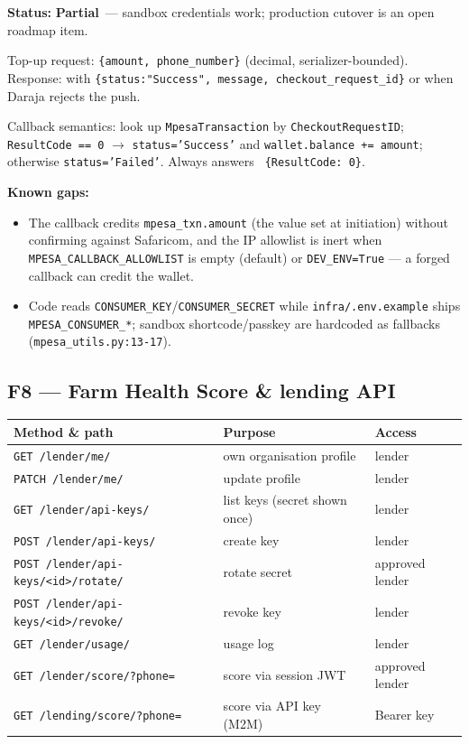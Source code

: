 \documentclass[11pt,a4paper]{article}
\newcommand{\partialstatus}{\textcolor{statuspart}{\textbf{Partial}}}
\newcommand{\code}[1]{\texttt{\allowbreak #1\allowbreak}}
\begin{document}
\textbf{Status:} \partialstatus\ --- sandbox credentials work; production
cutover is an open roadmap item.

Top-up request: \code{\{amount, phone\_number\}} (decimal, serializer-bounded).
Response: \code{200} with
\code{\{status:"Success", message, checkout\_request\_id\}} or \code{502}
when Daraja rejects the push.

Callback semantics: look up \code{MpesaTransaction} by
\code{CheckoutRequestID}; \code{ResultCode == 0} $\rightarrow$
\code{status='Success'} and \code{wallet.balance += amount}; otherwise
\code{status='Failed'}. Always answers \code{200 \{ResultCode: 0\}}.

\textbf{Known gaps:}
\begin{itemize}
  \item The callback credits \code{mpesa\_txn.amount} (the value set at
        initiation) without confirming against Safaricom, and the IP
        allowlist is inert when \code{MPESA\_CALLBACK\_ALLOWLIST} is empty
        (default) or \code{DEV\_ENV=True} --- a forged callback can credit
        the wallet.
  \item Code reads \code{CONSUMER\_KEY}/\code{CONSUMER\_SECRET} while
        \code{infra/.env.example} ships \code{MPESA\_CONSUMER\_*}; sandbox
        shortcode/passkey are hardcoded as fallbacks
        (\code{mpesa\_utils.py:13-17}).
\end{itemize}

\subsection{F8 --- Farm Health Score \& lending API}
\begin{center}
\small
\begin{tabularx}{\textwidth}{@{} l X l @{}}
\toprule
\textbf{Method \& path} & \textbf{Purpose} & \textbf{Access} \\
\midrule
\code{GET /lender/me/}     & own organisation profile & lender \\
\code{PATCH /lender/me/}   & update profile & lender \\
\code{GET  /lender/api-keys/}      & list keys (secret shown once) & lender \\
\code{POST /lender/api-keys/}      & create key & lender \\
\code{POST /lender/api-keys/<id>/rotate/} & rotate secret & approved lender \\
\code{POST /lender/api-keys/<id>/revoke/}  & revoke key & lender \\
\code{GET  /lender/usage/}         & usage log & lender \\
\code{GET  /lender/score/?phone=}  & score via session JWT & approved lender \\
\code{GET  /lending/score/?phone=} & score via API key (M2M) & Bearer key \\
\bottomrule
\end{tabularx}
\end{center}
\end{document}
